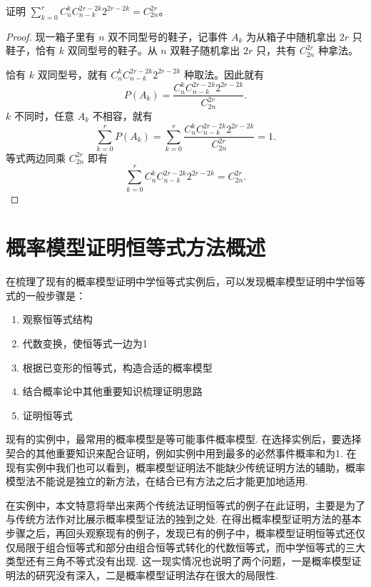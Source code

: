\begin{example}
  证明 \(\sum_{k=0}^r C_n^k C_{n-k}^{2r-2k} 2^{2r-2k} = C_{2n}^{2r}\)。
\end{example}
\begin{proof}
现一箱子里有 \(n\) 双不同型号的鞋子，记事件 \(A_k\) 为从箱子中随机拿出 \(2r\) 只鞋子，恰有 \(k\) 双同型号的鞋子。从 \(n\) 双鞋子随机拿出 \(2r\) 只，共有 \(C_{2n}^{2r}\) 种拿法。

恰有 \(k\) 双同型号，就有 \(C_{n}^{k} C_{n - k}^{2r - 2k} 2^{2r - 2k}\) 种取法。因此就有
\[
P(A_k) = \frac{C_{n}^{k} C_{n - k}^{2r - 2k} 2^{2r - 2k}}{C_{2n}^{2r}}. 
\]
\(k\) 不同时，任意 \(A_k\) 不相容，就有
\[
\sum_{k = 0}^{r} P(A_k) = \sum_{k = 0}^{r} \frac{C_{n}^{k} C_{n - k}^{2r - 2k} 2^{2r - 2k}}{C_{2n}^{2r}} = 1. 
\]
等式两边同乘 \(C_{2n}^{2r}\) 即有
\[
\sum_{k = 0}^{r} C_{n}^{k} C_{n - k}^{2r - 2k} 2^{2r - 2k} = C_{2n}^{2r}. 
\]
\end{proof}

\section{概率模型证明恒等式方法概述}
在梳理了现有的概率模型证明中学恒等式实例后，可以发现概率模型证明中学恒等式的一般步骤是：
\begin{enumerate}
  \item 观察恒等式结构
  \item 代数变换，使恒等式一边为1
  \item 根据已变形的恒等式，构造合适的概率模型
  \item 结合概率论中其他重要知识梳理证明思路
  \item 证明恒等式
\end{enumerate}

现有的实例中，最常用的概率模型是等可能事件概率模型. 在选择实例后，要选择契合的其他重要知识来配合证明，例如实例中用到最多的必然事件概率和为1. 在现有实例中我们也可以看到，概率模型证明法不能缺少传统证明方法的辅助，概率模型法不能说是独立的新方法，在结合已有方法之后才能更加地适用. 

在实例中，本文特意将举出来两个传统法证明恒等式的例子在此证明，主要是为了与传统方法作对比展示概率模型证法的独到之处. 
在得出概率模型证明方法的基本步骤之后，再回头观察现有的例子，发现已有的例子中，概率模型证明恒等式还仅仅局限于组合恒等式和部分由组合恒等式转化的代数恒等式，而中学恒等式的三大类型还有三角不等式没有出现. 这一现实情况也说明了两个问题，一是概率模型证明法的研究没有深入，二是概率模型证明法存在很大的局限性. 

